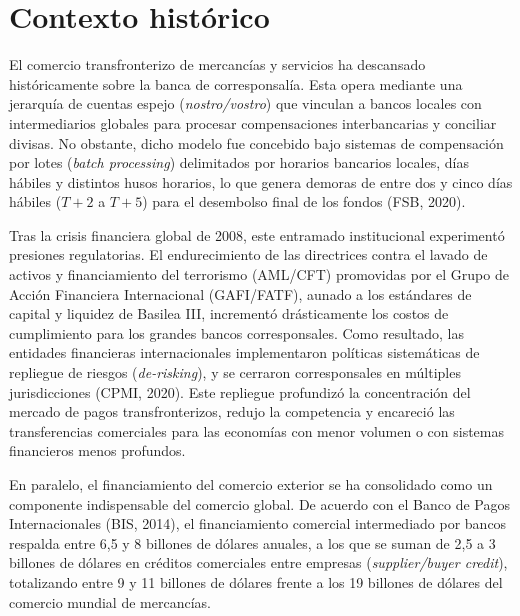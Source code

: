 \documentclass[spanish,11pt]{article}
\begin{document}
\section{Contexto histórico}\label{contexto-historico}

El comercio transfronterizo de mercancías y servicios ha descansado históricamente sobre la banca de corresponsalía. Esta 
opera mediante una jerarquía de cuentas espejo (\emph{nostro/vostro}) que vinculan a bancos locales con intermediarios 
globales para procesar compensaciones interbancarias y conciliar divisas. No obstante, dicho modelo fue concebido 
bajo sistemas de compensación por lotes (\emph{batch processing}) delimitados por horarios bancarios locales, 
días hábiles y distintos husos horarios, lo que genera demoras de entre dos y cinco días hábiles ($T+2$ a $T+5$) 
para el desembolso final de los fondos (FSB, 2020).

Tras la crisis financiera global de 2008, este entramado institucional experimentó presiones regulatorias. El endurecimiento 
de las directrices contra el lavado de activos y financiamiento del terrorismo (AML/CFT) promovidas por el Grupo de Acción 
Financiera Internacional (GAFI/FATF), aunado a los estándares de capital y liquidez de Basilea III, incrementó drásticamente 
los costos de cumplimiento para los grandes bancos corresponsales. Como resultado, las entidades financieras 
internacionales implementaron políticas sistemáticas de repliegue de riesgos (\emph{de-risking}), y se cerraron corresponsales
en múltiples jurisdicciones (CPMI, 2020). Este repliegue profundizó la concentración del mercado de pagos transfronterizos, 
redujo la competencia y encareció las transferencias comerciales para las economías con menor volumen o con 
sistemas financieros menos profundos.

En paralelo, el financiamiento del comercio exterior se ha consolidado como un componente indispensable del comercio global. 
De acuerdo con el Banco de Pagos Internacionales (BIS, 2014), el financiamiento comercial intermediado por bancos 
respalda entre 6,5 y 8 billones de dólares anuales, a los que se suman de 2,5 a 3 billones de dólares en créditos 
comerciales entre empresas (\emph{supplier/buyer credit}), totalizando entre 9 y 11 billones de dólares 
frente a los 19 billones de dólares del comercio mundial de mercancías. 
\end{document}

